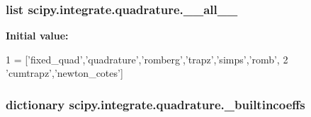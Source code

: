 \subsubsection[{\+\_\+\+\_\+all\+\_\+\+\_\+}]{\setlength{\rightskip}{0pt plus 5cm}list scipy.\+integrate.\+quadrature.\+\_\+\+\_\+all\+\_\+\+\_\+}\label{namespacescipy_1_1integrate_1_1quadrature_a702cfc5034a5d8f4a7c1d962c6d7aab7}
{\bfseries Initial value\+:}
\begin{DoxyCode}
1 = [\textcolor{stringliteral}{'fixed\_quad'},\textcolor{stringliteral}{'quadrature'},\textcolor{stringliteral}{'romberg'},\textcolor{stringliteral}{'trapz'},\textcolor{stringliteral}{'simps'},\textcolor{stringliteral}{'romb'},
2            \textcolor{stringliteral}{'cumtrapz'},\textcolor{stringliteral}{'newton\_cotes'}]
\end{DoxyCode}
\hypertarget{namespacescipy_1_1integrate_1_1quadrature_a56fc32638c1b1719993c6bc675708ad2}{}
\subsubsection[{\+\_\+builtincoeffs}]{\setlength{\rightskip}{0pt plus 5cm}dictionary scipy.\+integrate.\+quadrature.\+\_\+builtincoeffs}\label{namespacescipy_1_1integrate_1_1quadrature_a56fc32638c1b1719993c6bc675708ad2}

